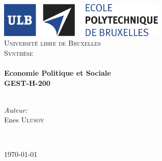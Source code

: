 
\begin{titlepage}
\begin{center}

\includegraphics[width=0.6\textwidth]{logoulb2}~\\[1cm]

\textsc{\LARGE Université libre de Bruxelles}\\[1.5cm]

\textsc{\Large Synthèse}\\[0.4cm]

 
\HRule \\[0.4cm]
\LARGE
\textbf{\bfseries Economie Politique et Sociale}\\[0.4cm]
\textbf{GEST-H-200} \\[0.14cm]

\HRule \\[1cm]
\begin{minipage}{0.4\textwidth}
	\begin{flushleft} \large
		\emph{Auteur:}\\
		Enes \textsc{Ulusoy}\\
	\end{flushleft}
\end{minipage}
\begin{minipage}{0.40\textwidth}
\
\end{minipage}
\vfill

{\large \today}
\end{center}
\end{titlepage}
